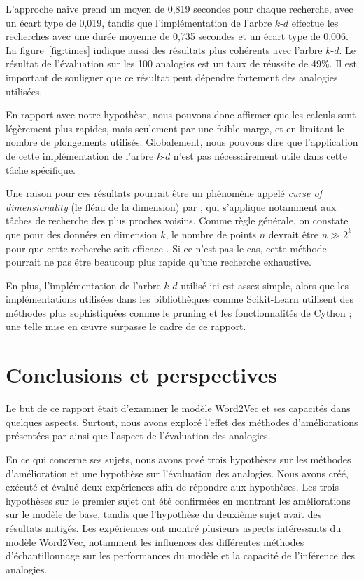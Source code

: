 \documentclass[12pt]{article}
\begin{document}
L'approche na\"\i ve prend un moyen de 0{,}819 secondes pour chaque recherche, avec un écart type de 0{,}019, tandis que l'implémentation de l'arbre $k$-$d$ effectue les recherches avec une durée moyenne de 0{,}735 secondes et un écart type de 0{,}006. La figure~\ref{fig:times} indique aussi des résultats plus cohérents avec l'arbre $k$-$d$. Le résultat de l'évaluation sur les 100 analogies est un taux de réussite de 49\%. Il est important de souligner que ce résultat peut dépendre fortement des analogies utilisées.

En rapport avec notre hypothèse, nous pouvons donc affirmer que les calculs sont légèrement plus rapides, mais seulement par une faible marge, et en limitant le nombre de plongements utilisés. Globalement, nous pouvons dire que l'application de cette implémentation de l'arbre $k$-$d$ n'est pas nécessairement utile dans cette tâche spécifique.

Une raison pour ces résultats pourrait être un phénomène appelé \textit{curse of dimensionality} (le fléau de la dimension) par \cite{Freimer1961AdaptiveCP}, qui s'applique notamment aux tâches de recherche des plus proches voisins. Comme règle générale, on constate que pour des données en dimension $ k $, le nombre de points $ n $ devrait être $ n \gg 2^k $ pour que cette recherche soit efficace \citep{indyk2004nearest}. Si ce n'est pas le cas, cette méthode pourrait ne pas être beaucoup plus rapide qu'une recherche exhaustive.

En plus, l'implémentation de l'arbre $k$-$d$ utilisé ici est assez simple, alors que les implémentations utilisées dans les bibliothèques comme Scikit-Learn utilisent des méthodes plus sophistiquées comme le pruning et les fonctionnalités de Cython \citep{behnel2011cython} ; une telle mise en œuvre surpasse le cadre de ce rapport. 
\newpage
\section{Conclusions et perspectives} \label{conclusions et perspectives}

Le but de ce rapport était d'examiner le modèle Word2Vec et ses capacités dans quelques aspects. Surtout, nous avons exploré l'effet des méthodes d'améliorations présentées par \cite{DBLP:conf/nips/MikolovSCCD13} ainsi que l'aspect de l'évaluation des analogies.

En ce qui concerne ses sujets, nous avons posé trois hypothèses sur les méthodes d'amélioration et une hypothèse sur l'évaluation des analogies. Nous avons créé, exécuté et évalué deux expériences afin de répondre aux hypothèses. Les trois hypothèses sur le premier sujet ont été confirmées en montrant les améliorations sur le modèle de base, tandis que l'hypothèse du deuxième sujet avait des résultats mitigés. Les expériences ont montré plusieurs aspects intéressants du modèle Word2Vec, notamment les influences des différentes méthodes d'échantillonnage sur les performances du modèle et la capacité de l'inférence des analogies. 
\end{document}
